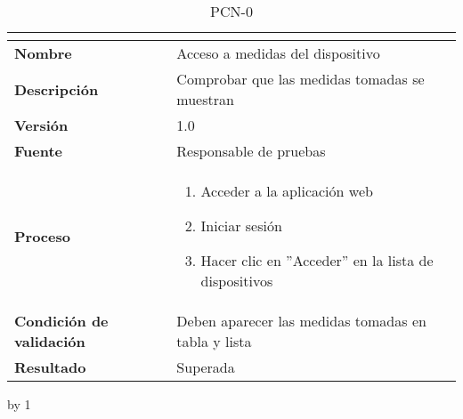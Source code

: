 \begin{table}[H]
	\caption{PCN-0\number\pcn}
	\begin{tabular}{|l|p{}|}
		\hline
		\multicolumn{2}{|c|}{\cellcolor[HTML]{BFBFBF}{\color[HTML]{000000} \textbf{PCN-0\number\pcn}}} \\ \hline
		\textbf{Nombre}                  & Acceso a medidas del dispositivo                    \\ \hline
		\textbf{Descripción}             & Comprobar que las medidas tomadas se muestran       \\ \hline
		\textbf{Versión}                 & 1.0                                                 \\ \hline
		\textbf{Fuente}                  & Responsable de pruebas                              \\ \hline
		\textbf{Proceso}                 & \begin{enumerate}
			\item Acceder a la aplicación web
			\item Iniciar sesión
			\item Hacer clic en ''Acceder'' en la lista de dispositivos
		\end{enumerate}                          \\ \hline
		\textbf{Condición de validación} & Deben aparecer las medidas tomadas en tabla y lista \\ \hline
		\textbf{Resultado}               & Superada                                            \\ \hline
	\end{tabular}
\end{table}
\advance\pcn by 1
